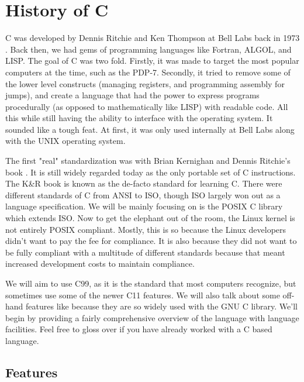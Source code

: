 \section{History of C}

C was developed by \gls{Dennis Ritchie} and \gls{Ken Thompson} at \gls{Bell Labs} back in 1973 \cite{Ritchie:1993:DCL:155360.155580}.
Back then, we had gems of programming languages like \gls{Fortran}, \gls{ALGOL}, and \gls{LISP}.
The goal of C was two fold.
Firstly, it was made to target the most popular computers at the time, such as the \gls{PDP-7}.
Secondly, it tried to remove some of the lower level constructs (managing \gls{registers}, and programming assembly for \gls{jumps}), and create a language that had the power to express programs procedurally (as opposed to mathematically like LISP) with readable code.
All this while still having the ability to interface with the operating system.
It sounded like a tough feat.
At first, it was only used internally at Bell Labs along with the UNIX operating system.

The first "real" standardization was with \gls{Brian Kernighan} and Dennis Ritchie's book \cite{kernighan1988c}.
It is still widely regarded today as the only \gls{portable} set of C instructions.
The K\&R book is known as the de-facto standard for learning C.
There were different standards of C from \gls{ANSI} to \gls{ISO}, though ISO largely won out as a language specification.
We will be mainly focusing on is the \gls{POSIX} C library which extends ISO.
Now to get the elephant out of the room, the \gls{Linux kernel} is not entirely POSIX compliant.
Mostly, this is so because the Linux developers didn't want to pay the fee for compliance.
It is also because they did not want to be fully compliant with a multitude of different standards because that meant increased development costs to maintain compliance.

We will aim to use C99, as it is the standard that most computers recognize, but sometimes use some of the newer C11 features.
We will also talk about some off-hand features like  because they are so widely used with the \gls{GNU C library}.
We'll begin by providing a fairly comprehensive overview of the language with language facilities.
Feel free to gloss over if you have already worked with a C based language.


\subsection{Features}

